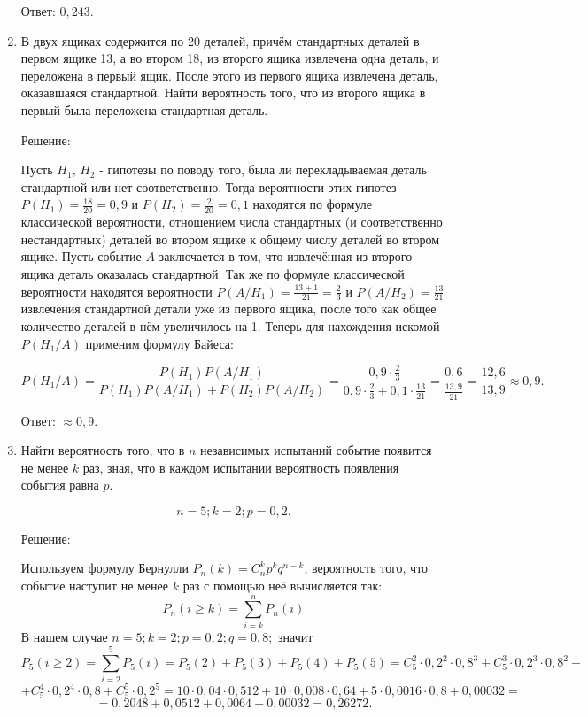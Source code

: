 \documentclass{article}
\renewcommand{\ge}{\ensuremath{\geqslant}}
\begin{document}
\begin{enumerate}
Ответ: $0,243$.

\item %
В двух ящиках содержится по 20 деталей, причём стандартных деталей в первом ящике 13, а во втором 18, из второго ящика извлечена одна деталь, и переложена в первый ящик. После этого из первого ящика извлечена деталь, оказавшаяся стандартной. Найти вероятность того, что из второго ящика в первый была переложена стандартная деталь.
\begin{center}Решение:\end{center}
Пусть $H_1$, $H_2$ - гипотезы по поводу того, была ли перекладываемая деталь стандартной или нет соответственно. \newline Тогда вероятности этих гипотез $P(H_1)=\frac{18}{20}=0,9$ и $P(H_2)=\frac{2}{20}=0,1$ находятся по формуле классической вероятности, отношением числа стандартных (и соответственно нестандартных) деталей во втором ящике к общему числу деталей во втором ящике.  \newline Пусть событие $A$ заключается в том, что извлечённая из второго ящика деталь оказалась стандартной. \newline
Так же по формуле классической вероятности находятся вероятности $P(A/H_1)=\frac{13+1}{21}=\frac{2}{3}$ и $P(A/H_2)=\frac{13}{21}$ извлечения стандартной детали уже из первого ящика, после того как общее количество деталей в нём увеличилось на 1. \newline
Теперь для нахождения искомой $P(H_1/A)$ применим формулу Байеса:

$$P(H_1/A)=\frac{P(H_1)P(A/H_1)}{P(H_1)P(A/H_1)+P(H_2)P(A/H_2)}=\frac{0,9\cdot\frac{2}{3}}{0,9\cdot\frac{2}{3}+0,1\cdot\frac{13}{21}}=\frac{0,6}{\frac{13,9}{21}}=\frac{12,6}{13,9}\approx0,9.$$

Ответ: $\approx0,9$.

\item %
Найти вероятность того, что в $n$ независимых испытаний событие появится не менее $k$ раз, зная, что в каждом испытании вероятность появления события равна $p$.

$$n=5; k=2; p=0,2.$$
\begin{center}Решение:\end{center}
Используем формулу Бернулли $P_n(k)=C_n^k p^k q^{n-k}$, вероятность того, что событие наступит не менее $k$ раз с помощью неё вычисляется так: $$P_n(i\ge k)=\sum_{i=k}^n P_n(i)$$
В нашем случае $n=5; k=2; p=0,2; q=0,8;$ значит
$$P_5(i\ge 2)=\sum_{i=2}^5 P_5(i)=P_5(2)+P_5(3)+P_5(4)+P_5(5)=C_5^2\cdot0,2^2\cdot0,8^3+C_5^3\cdot0,2^3\cdot0,8^2+$$
$$+C_5^4\cdot0,2^4\cdot0,8+C_5^5\cdot0,2^5=10\cdot0,04\cdot0,512+10\cdot0,008\cdot0,64+5\cdot0,0016\cdot0,8+0,00032=$$
$$=0,2048+0,0512+0,0064+0,00032=0,26272.$$


\end{enumerate}
\end{document}
